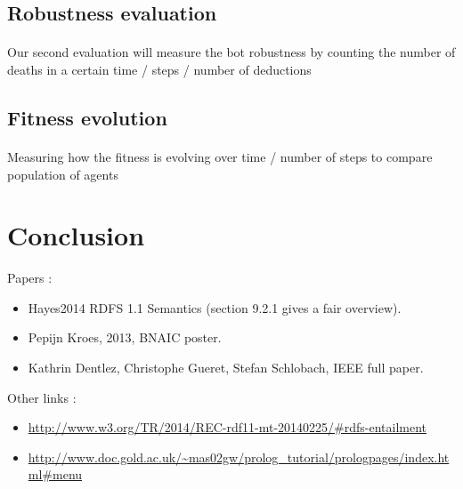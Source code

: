 \documentclass{article}
\newenvironment{itemh}[0]{\begin{itemize}[label=$\heartsuit$, font=\color{mygray} \small]}{\end{itemize}}
\begin{document}
	\subsection{Robustness evaluation}
		\paragraph{}
			Our second evaluation will measure the bot robustness by counting the number of deaths
			in a certain time / steps / number of deductions
	\subsection{Fitness evolution}
		\paragraph{}
			Measuring how the fitness is evolving over time / number of steps to compare population of agents
\newpage
\section{Conclusion}
	

\newpage


	Papers :
		\begin{itemh}
			\item Hayes2014 RDFS 1.1 Semantics (section 9.2.1 gives a fair overview).
			\item Pepijn Kroes, 2013, BNAIC poster.
			\item Kathrin Dentlez, Christophe Gueret, Stefan Schlobach, IEEE full paper.
		\end{itemh}
	Other links :
		\begin{itemh}
			\item\url{http://www.w3.org/TR/2014/REC-rdf11-mt-20140225/#rdfs-entailment}
			\item \url{http://www.doc.gold.ac.uk/~mas02gw/prolog_tutorial/prologpages/index.html#menu}
		\end{itemh}
\end{document}
